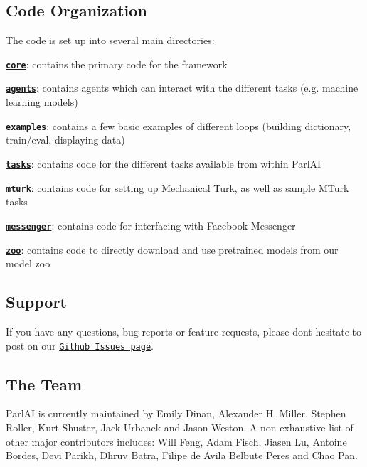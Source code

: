 \subsection*{Code Organization}

The code is set up into several main directories\+:


\begin{DoxyItemize}
\item \href{./parlai/core}{\tt {\bfseries core}}\+: contains the primary code for the framework
\item \href{./parlai/agents}{\tt {\bfseries agents}}\+: contains agents which can interact with the different tasks (e.\+g. machine learning models)
\item \href{./parlai/examples}{\tt {\bfseries examples}}\+: contains a few basic examples of different loops (building dictionary, train/eval, displaying data)
\item \href{./parlai/tasks}{\tt {\bfseries tasks}}\+: contains code for the different tasks available from within Parl\+AI
\item \href{./parlai/mturk}{\tt {\bfseries mturk}}\+: contains code for setting up Mechanical Turk, as well as sample M\+Turk tasks
\item \href{./parlai/chat_service/services/messenger}{\tt {\bfseries messenger}}\+: contains code for interfacing with Facebook Messenger
\item \href{./parlai/zoo}{\tt {\bfseries zoo}}\+: contains code to directly download and use pretrained models from our model zoo
\end{DoxyItemize}

\subsection*{Support}

If you have any questions, bug reports or feature requests, please don\textquotesingle{}t hesitate to post on our \href{https://github.com/facebookresearch/ParlAI/issues}{\tt Github Issues page}.

\subsection*{The Team}

Parl\+AI is currently maintained by Emily Dinan, Alexander H. Miller, Stephen Roller, Kurt Shuster, Jack Urbanek and Jason Weston. A non-\/exhaustive list of other major contributors includes\+: Will Feng, Adam Fisch, Jiasen Lu, Antoine Bordes, Devi Parikh, Dhruv Batra, Filipe de Avila Belbute Peres and Chao Pan.

